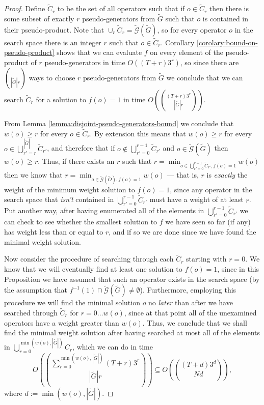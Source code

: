 \documentclass[12pt]{amsbook}
\theoremstyle{plain}
\theoremstyle{definition}
\theoremstyle{remark}
\newcommand{\set}{\tilde}
\newcommand{\genfun}{\tilde{\mathcal{G}}}
\newcommand{\paren}[1]{\left(#1\right)}
\begin{document}
\begin{proof}
Define $\set C_r$ to be the set of all operators such that if $o\in\set C_r$ then there is some subset of exactly $r$ pseudo-generators from $\set G$ such that $o$ is contained in their pseudo-product.  Note that $\cup_r \set C_r = \genfun(\set G)$, so for every operator $o$ in the search space there is an integer $r$ such that $o\in\set C_r$.  Corollary \ref{corolary:bound-on-pseudo-product} shows that we can evaluate $f$ on every element of the pseudo-product of $r$ pseudo-generators in time $O((T+r)3^r)$, so since there are $\choose{|\set G|}{r}$ ways to choose $r$ pseudo-generators from $\set G$ we conclude that we can search $\set C_r$ for a solution to $f(o)=1$ in time $O\paren{(T+r) 3^r \choose{|\set G|}{r}}$.

From Lemma \ref{lemma:disjoint-pseudo-generators-bound} we conclude that $w(o)\ge r$ for every $o\in\set C_r$.  By extension this means that $w(o)\ge r$ for every $o\in\bigcup_{r'=r}^{|\set G|}\set C_{r'}$, and therefore that if $o\notin\bigcup_{r'=0}^{r-1}\set C_{r'}$ and $o\in\genfun(\set G)$ then $w(o)\ge r$.  Thus, if there exists an $r$ such that $r=\min_{o\in\bigcup_{r'=0}^{r-1}\set C_{r'},f(o)=1}w(o)$ then we know that $r=\min_{o\in\genfun(\set O),f(o)=1}w(o)$ --- that is, $r$ is \emph{exactly} the weight of the minimum weight solution to $f(o)=1$, since any operator in the search space that \emph{isn't} contained in $\bigcup_{r'=0}^{r-1}\set C_{r'}$ must have a weight of at least $r$.  Put another way, after having enumerated all of the elements in $\bigcup_{r'=0}^{r-1}\set C_{r'}$ we can check to see whether the smallest solution to $f$ we have seen so far (if any) has weight less than or equal to $r$, and if so we are done since we have found the minimal weight solution.

Now consider the procedure of searching through each $\set C_r$ starting with $r=0$.  We know that we will eventually find at least one solution to $f(o)=1$, since in this Proposition we have assumed that such an operator exists in the search space (by the assumption that $f^{-1}(1)\cap\genfun(\set G)\ne\emptyset$).  Furthermore, employing this procedure we will find the minimal solution $o$ no \emph{later} than after we have searched through $\set C_r$ for $r=0\dots w(o)$, since at that point all of the unexamined operators have a weight greater than $w(o)$.  Thus, we conclude that we shall find the minimal weight solution after having searched at most all of the elements in $\bigcup_{r=0}^{\min(w(o),|\set G|)} C_r$, which we can do in time $$O\paren{\sum_{r=0}^{\min(w(o),|\set G|)}(T+r) 3^r \choose{|\set G|}{r}}\subseteq O\paren{(T+d) 3^d \choose{N}{d}},$$ where $d:=\min(w(o),|\set G|)$.
\end{proof}
\end{document}
